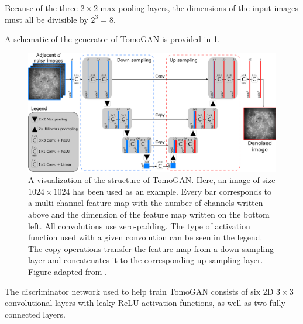 Because of the three $2\times2$ max pooling layers, the dimensions of the input images must all be divisible by $2^3=8$. 

A schematic of the generator of TomoGAN is provided in \cref{fig:tomoganstructure}.

\begin{figure}[htbp]
    \centering
    \includegraphics[width=1.\textwidth]{figures/tomoganstructure.png}
    \caption[Illustration of the structure of TomoGAN]{A visualization of the structure of TomoGAN. Here, an image of size $1024\times1024$ has been used as an example. Every bar corresponds to a multi-channel feature map with the number of channels written above and the dimension of the feature map written on the bottom left. All convolutions use zero-padding. The type of activation function used with a given convolution can be seen in the legend. The copy operations transfer the feature map from a down sampling layer and concatenates it to the corresponding up sampling layer. Figure adapted from \cite{liu2020tomogan}. } 
    \label{fig:tomoganstructure}
\end{figure}

The discriminator network used to help train TomoGAN consists of six 2D $3\times3$ convolutional layers with leaky ReLU activation functions, as well as two fully connected layers. 

